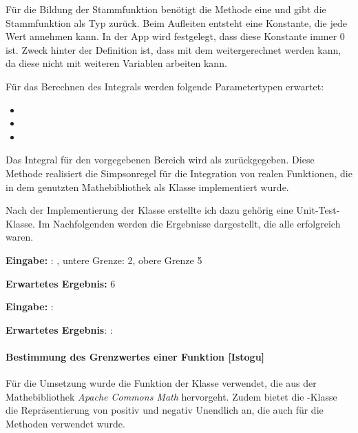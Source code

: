 Für die Bildung der Stammfunktion benötigt die Methode  eine  und gibt die Stammfunktion als Typ  zurück. Beim Aufleiten entsteht eine Konstante, die jede Wert annehmen kann. In der App wird festgelegt, dass diese Konstante immer 0 ist. Zweck hinter der Definition ist, dass mit dem  weitergerechnet werden kann, da diese nicht mit weiteren Variablen arbeiten kann.

Für das Berechnen des Integrals  werden folgende Parametertypen erwartet: 

\begin{itemize}
	\item {}
	\item {}
	\item {}
\end{itemize}

Das Integral für den vorgegebenen Bereich wird als  zurückgegeben. Diese Methode realisiert die Simpsonregel für die Integration von realen Funktionen, die in dem genutzten Mathebibliothek als Klasse  implementiert wurde. 

Nach der Implementierung der Klasse erstellte ich dazu gehörig eine Unit-Test-Klasse. Im Nachfolgenden werden die Ergebnisse dargestellt, die alle erfolgreich waren. 


\quad \quad \textbf{ Eingabe:} : , untere Grenze: 2, obere Grenze 5

\quad \quad \textbf{Erwartetes Ergebnis:} 6


\quad \quad \textbf{Eingabe:} : 

\quad \quad \textbf{Erwartetes Ergebnis}: : 

\vspace{1em}

\paragraph{Bestimmung des Grenzwertes einer Funktion [Istogu]}

Für die Umsetzung wurde die Funktion  der Klasse  verwendet, die aus der Mathebibliothek \textit{Apache Commons Math} hervorgeht. Zudem bietet die -Klasse die Repräsentierung von positiv und negativ Unendlich an, die auch für die Methoden verwendet wurde.

